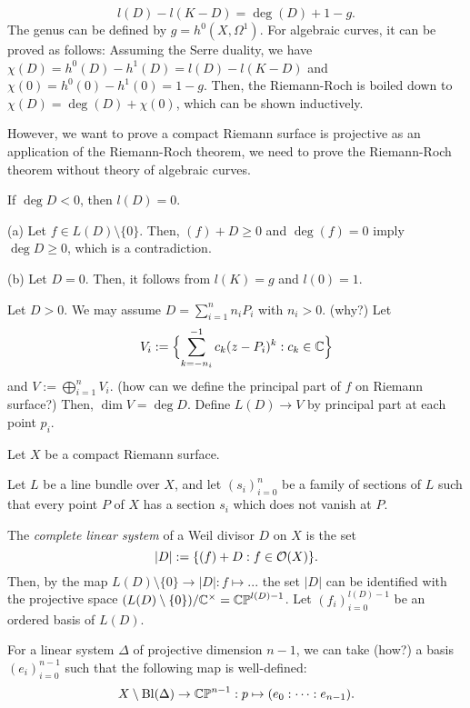 \documentclass{../../large}
\begin{document}
\begin{prb}
\[l(D)-l(K-D)=\deg(D)+1-g.\]
The genus can be defined by $g=h^0(X,\Omega^1)$.
For algebraic curves, it can be proved as follows:
Assuming the Serre duality, we have $\chi(D)=h^0(D)-h^1(D)=l(D)-l(K-D)$ and $\chi(0)=h^0(0)-h^1(0)=1-g$.
Then, the Riemann-Roch is boiled down to $\chi(D)=\deg(D)+\chi(0)$, which can be shown inductively.

However, we want to prove a compact Riemann surface is projective as an application of the Riemann-Roch theorem, we need to prove the Riemann-Roch theorem without theory of algebraic curves.
\begin{parts}
\item If $\deg D<0$, then $l(D)=0$.
\end{parts}
\end{prb}
\begin{pf}
(a)
Let $f\in L(D)\setminus\{0\}$.
Then, $(f)+D\ge0$ and $\deg(f)=0$ imply $\deg D\ge0$, which is a contradiction.

(b)
Let $D=0$.
Then, it follows from $l(K)=g$ and $l(0)=1$.

Let $D>0$.
We may assume $D=\sum_{i=1}^nn_iP_i$ with $n_i>0$. (why?)
Let
\[V_i:=\Bigl\{\sum_{k=-n_i}^{-1}c_k(z-P_i)^k:c_k\in\mathbb{C}\Bigr\}\]
and $V:=\bigoplus_{i=1}^nV_i$. (how can we define the principal part of $f$ on Riemann surface?)
Then, $\dim V=\deg D$.
Define $L(D)\to V$ by principal part at each point $p_i$.


\end{pf}

\begin{prb}
Let $X$ be a compact Riemann surface.

Let $L$ be a line bundle over $X$, and let $(s_i)_{i=0}^n$ be a family of sections of $L$ such that every point $P$ of $X$ has a section $s_i$ which does not vanish at $P$.

The \emph{complete linear system} of a Weil divisor $D$ on $X$ is the set
\[|D|:=\{(f)+D:f\in\mathcal{O}(X)\}.\]
Then, by the map $L(D)\setminus\{0\}\to|D|:f\mapsto...$
the set $|D|$ can be identified with the projective space $(L(D)\setminus\{0\})/\mathbb{C}^\times=\mathbb{CP}^{l(D)-1}$.
Let $(f_i)_{i=0}^{l(D)-1}$ be an ordered basis of $L(D)$.

For a linear system $\Delta$ of projective dimension $n-1$, we can take (how?) a basis $(e_i)_{i=0}^{n-1}$ such that the following map is well-defined:
\[X\setminus\mathrm{Bl}(\Delta)\to\mathbb{CP}^{n-1}:p\mapsto(e_0:\cdots:e_{n-1}).\]
\end{prb}
\end{document}

